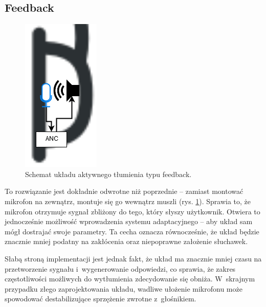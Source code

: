 \subsection{Feedback}
\label{feedback}
\begin{figure}[h!]
	\centering
	\includegraphics[scale=0.7]{../Assets/feedback.png}
	\caption{Schemat układu aktywnego tłumienia typu feedback.}
	\label{fig:feedback}
\end{figure}
To rozwiązanie jest dokładnie odwrotne niż poprzednie -- zamiast montować mikrofon na zewnątrz, montuje się go wewnątrz muszli (rys. \ref{fig:feedback}). Sprawia to, że mikrofon otrzymuje sygnał zbliżony do tego, który słyszy użytkownik. Otwiera to jednocześnie możliwość wprowadzenia systemu adaptacyjnego -- aby układ sam mógł dostrajać swoje parametry. Ta cecha oznacza równocześnie, że układ będzie znacznie mniej podatny na zakłócenia oraz niepoprawne założenie słuchawek.

Słabą stroną implementacji jest jednak fakt, że układ ma znacznie mniej czasu na przetworzenie sygnału i~wygenerowanie odpowiedzi, co sprawia, że zakres częstotliwości możliwych do wytłumienia zdecydowanie się obniża. W~skrajnym przypadku złego zaprojektowania układu, wadliwe ułożenie mikrofonu może spowodować destabilizujące sprzężenie zwrotne z~głośnikiem.
